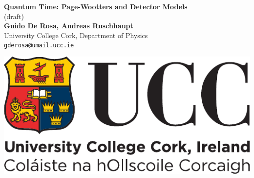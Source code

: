 \documentclass[a0,portrait]{a0poster}
\begin{document}
\begin{minipage}[c]{0.75\linewidth}%
\Huge \color{NavyBlue} \textbf{Quantum Time: Page-Wootters and Detector Models}
\\ {\normalsize (draft)}
\color{Black}
\\[0.7cm]
\Large \textbf{Guido De Rosa, Andreas Ruschhaupt}\\[0.5cm] %
\Large University College Cork, Department of Physics\\[0.4cm] %
\large%
\texttt{gderosa@umail.ucc.ie}
\end{minipage}%
%
\begin{minipage}[t]{0.25\linewidth}
\hspace{3cm}\includegraphics[width=14cm]{ucc_logo.pdf}\\  %
\end{minipage}

\vspace{1cm} %

\end{document}

